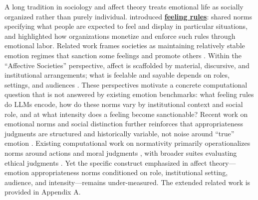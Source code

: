 \documentclass[11pt]{article}
\begin{document}
A long tradition in sociology and affect theory treats emotional life as socially organized rather than purely individual.
\citet{hochschild1979emotionwork} introduced \textbf{\underline{feeling rules}}: shared norms specifying what people are expected to feel and display in particular situations, and \citet{russell2012managed} highlighted how organizations monetize and enforce such rules through emotional labor.
Related work frames societies as maintaining relatively stable emotion regimes that sanction some feelings and promote others \citep{reddy2001navigationoffeeling}.
Within the ``Affective Societies'' perspective, affect is scaffolded by material, discursive, and institutional arrangements; what is feelable and sayable depends on roles, settings, and audiences \citep{slaby2019affectivesocieties,slaby2019affectivearrangements}.
These perspectives motivate a concrete computational question that is not answered by existing emotion benchmarks:
what feeling rules do LLMs encode, how do these norms vary by institutional context and social role, and at what intensity does a feeling become sanctionable?
Recent work on emotional norms and social distinction further reinforces that appropriateness judgments are structured and historically variable, not noise around ``true'' emotion \citep{cummins2024feelingtherules,vonscheve2012emotionregulation}. Existing computational work on normativity primarily operationalizes norms around actions and moral judgments \citep{forbes-etal-2020-social,ziems-etal-2023-normbank}, with broader suites evaluating ethical judgments \citep{hendrycks2021ethics}.
Yet the specific construct emphasized in affect theory---emotion appropriateness norms conditioned on role, institutional setting, audience, and intensity---remains under-measured. The extended related work is provided in Appendix A.
\end{document}
